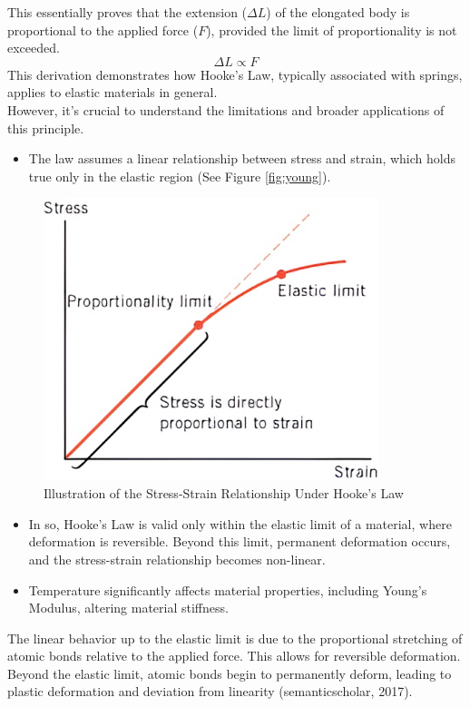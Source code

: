\documentclass{article}
\begin{document}
{\begin{minipage}{0.52\textwidth}
This essentially proves that the extension (\(\Delta L\)) of the elongated body is proportional to the applied force (\(F\)), provided the limit of proportionality is not exceeded. 
\begin{equation}
    \Delta L \propto F
\end{equation}
This derivation demonstrates how Hooke's Law, typically associated with springs, applies to elastic materials in general.\\[8pt] 
However, it's crucial to understand the limitations and broader applications of this principle.
\begin{itemize}
    \item The law assumes a linear relationship between stress and strain, which holds true only in the elastic region (See Figure \ref{fig:young}).
\end{itemize}
\end{minipage}\hfill
\begin{minipage}{0.45\textwidth}
    \begin{figure}[H]
    \centering
    \includegraphics[width=0.87\textwidth]{images/hook(1).png}
    \caption{Illustration of the Stress-Strain Relationship Under Hooke’s Law}
    \label{fig:hook}
\end{figure}
\end{minipage}
\begin{itemize}
    \item In so, Hooke's Law is valid only within the elastic limit of a material, where deformation is reversible. Beyond this limit, permanent deformation occurs, and the stress-strain relationship becomes non-linear.
    \item Temperature significantly affects material properties, including Young's Modulus, altering material stiffness.
\end{itemize}
The linear behavior up to the elastic limit is due to the proportional stretching of atomic bonds relative to the applied force. This allows for reversible deformation. Beyond the elastic limit, atomic bonds begin to permanently deform, leading to plastic deformation and deviation from linearity (semanticscholar, 2017). \\[8pt]

}
\end{document}
